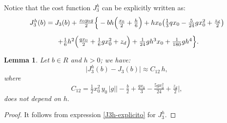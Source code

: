 \documentclass[11pt]{article}
\newtheorem{Lemma}{Lemma}
\begin{document}
 
 
Notice that the cost function ${J^h_{3}}$ can be explicitly written as:
   \begin{equation}\label{J3h-explicito}
   \begin{array}{ll}
{J^h_{3}} (b)= J_3(b) +\tfrac{x_0 y_0 g}{2} \Big\{ - b h  \Big( \tfrac{x_0}{2} + \tfrac{h}{6}  \Big) +h  x_0 \big(\tfrac{1}{3} q x_0-\tfrac{5}{24} g x_0^2+\tfrac{z_d}{2} \big)\\[0.45cm]
\hspace{1.45cm}+\tfrac{1}{6} h^2 \Big(\tfrac{q x_0}{2}+\tfrac{1}{6} g  x_0^2+z_d \Big) +\tfrac{1}{24} g h^3 x_0+\tfrac{1}{180}g h^4\Big\}.
\end{array}
\end{equation}

\begin{Lemma}\label{Lema J3 J3h}
Let  $b \in R$ and $h>0$; we have:
    \begin{equation}\label{ec 5.3} 
        \lvert  {J^h_{3}}(b) - J_3(b) \rvert  \approx C_{12} \, h, 
     \end{equation}
     where  $$C_{12} = \tfrac{1}{2}x_0^2\, y_0\,| g| \Big \lvert  -\tfrac{b}{2} + \tfrac{q x_0}{3} -\tfrac{5 g x_0^2}{24} + \tfrac{z_d}{2} \Big \rvert,$$ 
   does not depend on $h.$
      
      \end{Lemma}
\begin{proof}
It follows from expression \eqref{J3h-explicito} for ${J^h_{3}}$.
\end{proof}    \noindent
\end{document}
